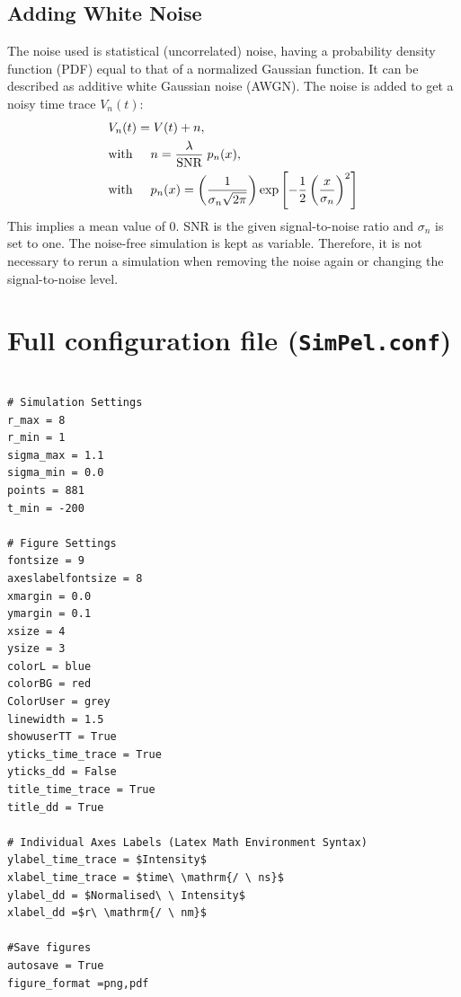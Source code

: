 \documentclass[pdftex,bezier,german,a4,twoside, headexclude,12pt,nochapterprefix, titlepage]{extarticle}
\begin{document}
\subsection{Adding White Noise}

The noise used is statistical (uncorrelated) noise, having a probability density function (PDF) equal to that of a normalized Gaussian function.
It can be described as additive white Gaussian noise (AWGN). The noise is added to get a noisy time trace $V_n(t)$:
\begin{align}
\begin{split}
 & V_n(t) = V(t)+n,\\
 &\mbox{with}\hspace{0.5cm} n = \dfrac{\lambda}{\text{SNR}} \; p_n(x), \\
 &\mbox{with}\hspace{0.5cm} p_n(x) = \left(\dfrac{1}{\sigma_n \sqrt{2\pi}}\right)
 \mathrm{exp}\left[-\frac{1}{2}\left(\frac{x}{\sigma_n}\right)^2\right]
 \end{split}
\end{align}
This implies a mean value of $0$. SNR is the given signal-to-noise ratio and $\sigma_n$ is set to one.
The noise-free simulation is kept as variable. Therefore, it is not necessary to rerun a simulation when removing the noise again or
changing the signal-to-noise level.


\newpage

\section{Full configuration file (\texttt{SimPel.conf})}

\begin{lstlisting}[caption={Complete configuration file of the default settings of SimPel},label = full_config_list]

# Simulation Settings
r_max = 8
r_min = 1
sigma_max = 1.1
sigma_min = 0.0
points = 881
t_min = -200

# Figure Settings
fontsize = 9
axeslabelfontsize = 8
xmargin = 0.0
ymargin = 0.1
xsize = 4
ysize = 3 
colorL = blue
colorBG = red
ColorUser = grey
linewidth = 1.5
showuserTT = True
yticks_time_trace = True
yticks_dd = False
title_time_trace = True
title_dd = True

# Individual Axes Labels (Latex Math Environment Syntax)
ylabel_time_trace = $Intensity$
xlabel_time_trace = $time\ \mathrm{/ \ ns}$
ylabel_dd = $Normalised\ \ Intensity$
xlabel_dd =$r\ \mathrm{/ \ nm}$

#Save figures
autosave = True
figure_format =png,pdf
\end{lstlisting}
\end{document}
